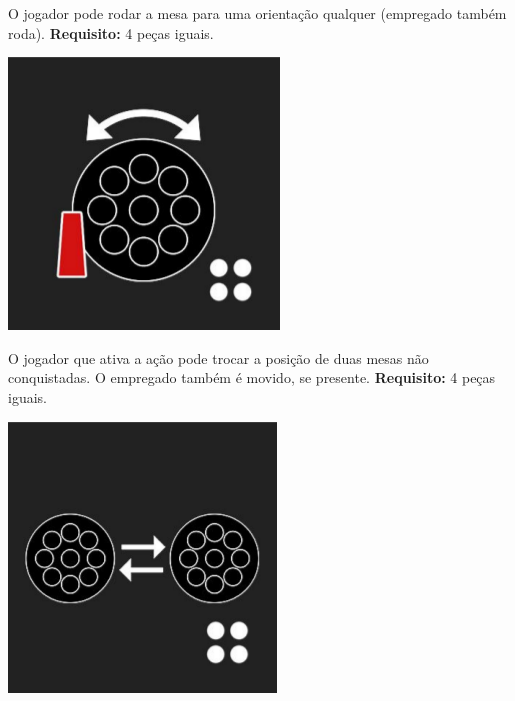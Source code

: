 \documentclass[a4paper]{article}
\begin{document}
\begin{itemize}
\begin{minipage}{0.58\textwidth}
\item O jogador pode rodar a mesa para uma orientação qualquer (empregado também roda). \newline
\textbf{Requisito:} 4 peças iguais.
\end{minipage}
\hspace{4mm}
\begin{minipage}{0.58\textwidth}
\includegraphics[scale=0.2]{rotate.png}
\end{minipage}

\begin{minipage}{0.58\textwidth}
\item O jogador que ativa a ação pode trocar a posição de duas mesas não conquistadas. O empregado também é movido, se presente. \newline 
\textbf{Requisito:} 4 peças iguais.
\end{minipage}
\hspace{4mm}
\begin{minipage}{0.58\textwidth}
\includegraphics[scale=0.2]{swap-unclaimed.png}
\end{minipage}


\end{itemize}
\end{document}
